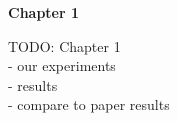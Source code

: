 \begin{center}
	{\Large \bfseries  Chapter 1}
\end{center}

TODO: Chapter 1 \\
- our experiments \\
- results \\
- compare to paper results

